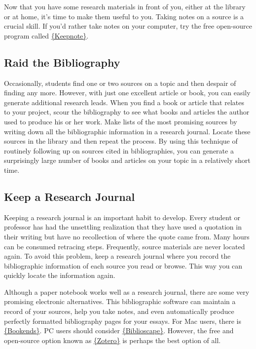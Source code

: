 \documentclass[book]{memoir}
\begin{document}
Now that you have some research materials in front of you, either at the library or at home, it's time to make them useful to you. Taking notes on a source is a crucial skill. If you'd rather take notes on your computer, try the free open-source program called \href{http://rasm.ods.org/keepnote}{\{Keepnote\}}.

\subsection{Raid the Bibliography}

Occasionally, students find one or two sources on a topic and then despair of finding any more. However, with just one excellent article or book, you can easily generate additional research leads. When you find a book or article that relates to your project, scour the bibliography to see what books and articles the author used to produce his or her work. Make lists of the most promising sources by writing down all the bibliographic information in a research journal. Locate these sources in the library and then repeat the process. By using this technique of routinely following up on sources cited in bibliographies, you can generate a surprisingly large number of books and articles on your topic in a relatively short time.

\subsection{Keep a Research Journal}

Keeping a research journal is an important habit to develop. Every student or professor has had the unsettling realization that they have used a quotation in their writing but have no recollection of where the quote came from. Many hours can be consumed retracing steps. Frequently, source materials are never located again. To avoid this problem, keep a research journal where you record the bibliographic information of each source you read or browse. This way you can quickly locate the information again. 

Although a paper notebook works well as a research journal, there are some very promising electronic alternatives. This bibliographic software can maintain a record of your sources, help you take notes, and even automatically produce perfectly formatted bibliography pages for your essays. For Mac users, there is \href{http://www.sonnysoftware.com/}{\{Bookends\}}. PC users should consider \href{http://www.biblioscape.com}{\{Biblioscape\}}. However, the free and open-source option known as \href{http://zotero.org}{\{Zotero\}} is perhaps the best option of all.
\end{document}
